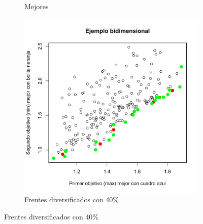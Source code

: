 \documentclass{article}
\begin{document}
\begin{figure}[h!]
\begin{subfigure}[b]{0.3\linewidth}
\caption{Mejores}
\label{r140}
\end{subfigure}
\begin{subfigure}[b]{0.3\linewidth}
\includegraphics[width=\linewidth]{p11_frentesub.png}
\caption{Frentes diversificados con 40\%}
\label{r170}
\end{subfigure}
\label{fig1}
\end{figure}



\end{document}
